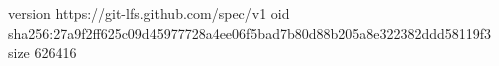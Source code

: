 version https://git-lfs.github.com/spec/v1
oid sha256:27a9f2ff625c09d45977728a4ee06f5bad7b80d88b205a8e322382ddd58119f3
size 626416
